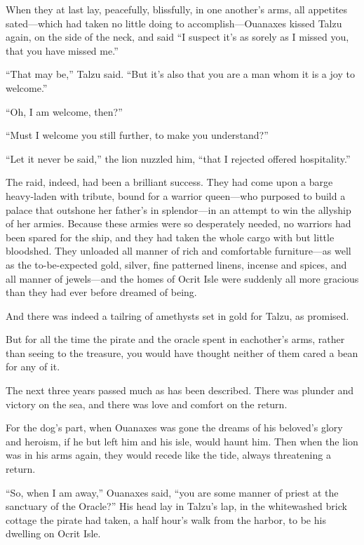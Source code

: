 When they at last lay, peacefully, blissfully, in one another's arms, all appetites sated---which had taken no little doing to accomplish---Ouanaxes kissed Talzu again, on the side of the neck, and said ``I suspect it's as sorely as I missed you, that you have missed me.''

``That may be,'' Talzu said. ``But it's also that you are a man whom it is a joy to welcome.''

``Oh, I am welcome, then?''

``Must I welcome you still further, to make you understand?''

``Let it never be said,'' the lion nuzzled him, ``that I rejected offered hospitality.''

The raid, indeed, had been a brilliant success. They had come upon a barge heavy-laden with tribute, bound for a warrior queen---who purposed to build a palace that outshone her father's in splendor---in an attempt to win the allyship of her armies. Because these armies were so desperately needed, no warriors had been spared for the ship, and they had taken the whole cargo with but little bloodshed. They unloaded all manner of rich and comfortable furniture---as well as the to-be-expected gold, silver, fine patterned linens, incense and spices, and all manner of jewels---and the homes of Ocrit Isle were suddenly all more gracious than they had ever before dreamed of being.

And there was indeed a tailring of amethysts set in gold for Talzu, as promised.

But for all the time the pirate and the oracle spent in eachother's arms, rather than seeing to the treasure, you would have thought neither of them cared a bean for any of it.

\secdiv

The next three years passed much as has been described. There was plunder and victory on the sea, and there was love and comfort on the return.

For the dog's part, when Ouanaxes was gone the dreams of his beloved's glory and heroism, if he but left him and his isle, would haunt him. Then when the lion was in his arms again, they would recede like the tide, always threatening a return.

``So, when I am away,'' Ouanaxes said, ``you are some manner of priest at the sanctuary of the Oracle?'' His head lay in Talzu's lap, in the whitewashed brick cottage the pirate had taken, a half hour's walk from the harbor, to be his dwelling on Ocrit Isle.

